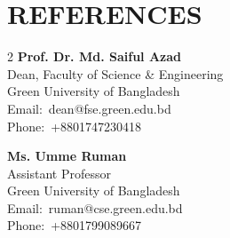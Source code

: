 \documentclass[a4paper,10pt]{article}
\newcommand{\faPhone}{Phone:}
\newcommand{\faEnvelope}{Email:}
\begin{document}
\vspace{-0.2cm}

\section*{REFERENCES}
\vspace{-0.3cm}
\begin{multicols}{2}
\textbf{Prof. Dr. Md. Saiful Azad}\\
Dean, Faculty of Science \& Engineering\\
Green University of Bangladesh\\
\faEnvelope\ dean@fse.green.edu.bd\\
\faPhone\ +8801747230418\\[0.15em]

\columnbreak

\textbf{Ms. Umme Ruman}\\
Assistant Professor\\
Green University of Bangladesh\\
\faEnvelope\ ruman@cse.green.edu.bd\\
\faPhone\ +8801799089667
\end{multicols}
\end{document}
